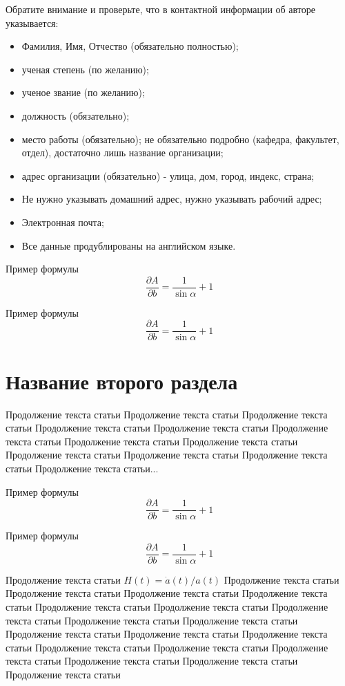 Обратите внимание и проверьте, что в контактной информации об авторе указывается:
\begin{itemize}
	\item Фамилия, Имя, Отчество (обязательно полностью);
	\item ученая степень (по желанию);
	\item ученое звание (по желанию);
	\item должность (обязательно);
	\item место работы (обязательно);
не обязательно подробно (кафедра, факультет, отдел), достаточно лишь название организации;
	\item адрес организации (обязательно) -  улица, дом, город, индекс, страна;
	\item Не нужно указывать домашний адрес, нужно указывать рабочий адрес;
	\item Электронная почта;
	\item Все данные продублированы на английском языке.
\end{itemize}

Пример формулы 
\begin{equation}
\frac{\partial A}{\partial b}=\frac{1}{\sin \alpha } + 1
\end{equation}

Пример формулы 
\begin{equation}
\frac{\partial A}{\partial b}=\frac{1}{\sin \alpha } + 1
\end{equation}


\section{Название второго раздела}
Продолжение текста статьи Продолжение текста статьи Продолжение текста статьи Продолжение текста статьи Продолжение текста статьи Продолжение текста статьи Продолжение текста статьи Продолжение текста статьи Продолжение текста статьи Продолжение текста статьи Продолжение текста статьи Продолжение текста статьи... 

Пример формулы 
\begin{equation}
\frac{\partial A}{\partial b}=\frac{1}{\sin \alpha } + 1
\end{equation}


Пример формулы 
\begin{equation}
\frac{\partial A}{\partial b}=\frac{1}{\sin \alpha } + 1
\end{equation}

\noindent 
Продолжение текста статьи $H(t)=\dot{a}(t)/a(t)$ Продолжение текста статьи Продолжение текста статьи Продолжение текста статьи Продолжение текста статьи Продолжение текста статьи Продолжение текста статьи Продолжение текста статьи Продолжение текста статьи Продолжение текста статьи Продолжение текста статьи Продолжение текста статьи Продолжение текста статьи Продолжение текста статьи Продолжение текста статьи Продолжение текста статьи Продолжение текста статьи Продолжение текста статьи Продолжение текста статьи 

